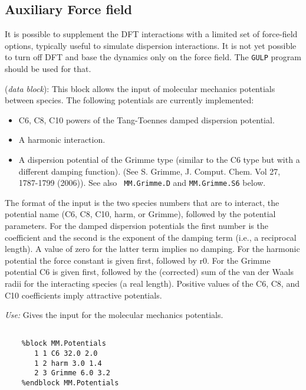 \documentclass[11pt]{article}
\begin{document}
\vspace{5pt}
\subsection{Auxiliary Force field}

It is possible to supplement the DFT interactions with a limited
set of force-field options, typically useful to simulate dispersion
interactions. It is not yet possible to turn off DFT and base the
dynamics only on the force field. The {\tt GULP} program should be
used for that.

\begin{description}
\itemsep 10pt
\parsep 0pt

\item[{\bf MM.Potentials}] ({\it data block}):
 This block allows the input
of molecular mechanics potentials between species. The following
potentials are currently implemented:
\begin{itemize}
\item C6, C8, C10 powers of the Tang-Toennes damped dispersion
  potential.
\item A harmonic interaction.
\item A dispersion potential of the Grimme type (similar to the C6
  type but with a different damping function). (See S. Grimme,
  J. Comput. Chem. Vol 27, 1787-1799 (2006)). See also {\tt
  MM.Grimme.D} and {\tt MM.Grimme.S6} below.
\end{itemize}

The format of the input is the two species numbers that are to
interact, the potential name (C6, C8, C10, harm, or Grimme), followed
by the potential parameters. For the damped dispersion potentials the
first number is the coefficient and the second is the exponent of the
damping term (i.e., a reciprocal length). A value of zero for the
latter term implies no damping. For the harmonic potential the force
constant is given first, followed by r0. For the Grimme potential C6
is given first, followed by the (corrected) sum of the van der Waals
radii for the interacting species (a real length). Positive values of
the C6, C8, and C10 coefficients imply attractive potentials.

{\it Use:} Gives the input for the molecular mechanics potentials.

\begin{verbatim}

    %block MM.Potentials
       1 1 C6 32.0 2.0
       1 2 harm 3.0 1.4
       2 3 Grimme 6.0 3.2
    %endblock MM.Potentials


\end{verbatim}
\end{description}
\end{document}
